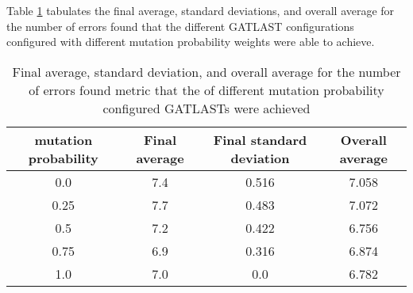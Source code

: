 Table \ref{tab:HP:GA:mutationProp:number of errors found} tabulates the final average, standard deviations, and overall average for the number of errors found that the different GATLAST configurations configured with different mutation probability weights were able to achieve.
\begin{table}[tbh!]
\centering
\begin{adjustbox}{trim=0cm 0cm 0cm 0cm, clip=true}
\begin{tabular}{|c|c|c|c|}
\hline
mutation probability & Final average & Final standard deviation & Overall average\\
\hline
0.0 & 7.4 & 0.516 & 7.058\\\hline
0.25 & 7.7 & 0.483 & 7.072\\\hline
0.5 & 7.2 & 0.422 & 6.756\\\hline
0.75 & 6.9 & 0.316 & 6.874\\\hline
1.0 & 7.0 & 0.0 & 6.782\\\hline
\end{tabular}
\end{adjustbox}
\caption{Final average, standard deviation, and overall average for the number of errors found metric that the of different mutation probability configured GATLASTs were achieved}
\label{tab:HP:GA:mutationProp:number of errors found}
\end{table}